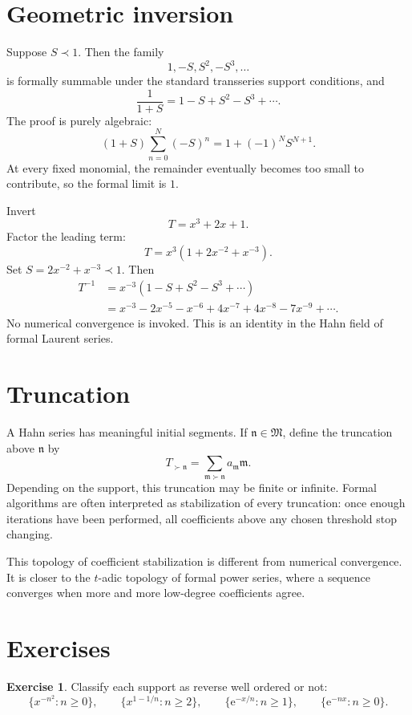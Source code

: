 \documentclass[11pt,openany]{book}
\theoremstyle{definition}
\newtheorem{exercise}{Exercise}[chapter]
\theoremstyle{plain}
\theoremstyle{remark}
\newcommand{\M}{\mathfrak{M}}
\newcommand{\m}{\mathfrak{m}}
\newcommand{\n}{\mathfrak{n}}
\newcommand{\e}{\mathrm{e}}
\newcommand{\precdom}{\prec}
\newcommand{\succdom}{\succ}
\begin{document}
\section{Geometric inversion}

Suppose $S\precdom1$. Then the family
\[
 1,-S,S^2,-S^3,\ldots
\]
is formally summable under the standard transseries support conditions, and
\begin{equation}\label{eq:formal-geometric}
 \frac1{1+S}=1-S+S^2-S^3+\cdots.
\end{equation}
The proof is purely algebraic:
\[
 (1+S)\sum_{n=0}^{N}(-S)^n=1+(-1)^NS^{N+1}.
\]
At every fixed monomial, the remainder eventually becomes too small to contribute, so the formal limit is $1$.

\begin{workedbox}
Invert
\[
 T=x^3+2x+1.
\]
Factor the leading term:
\[
 T=x^3(1+2x^{-2}+x^{-3}).
\]
Set $S=2x^{-2}+x^{-3}\precdom1$. Then
\begin{align*}
 T^{-1}
 &=x^{-3}(1-S+S^2-S^3+\cdots)\\
 &=x^{-3}-2x^{-5}-x^{-6}+4x^{-7}+4x^{-8}
 -7x^{-9}+\cdots.
\end{align*}
No numerical convergence is invoked. This is an identity in the Hahn field of formal Laurent series.
\end{workedbox}

\section{Truncation}

A Hahn series has meaningful initial segments. If $\n\in\M$, define the truncation above $\n$ by
\[
 T_{\succdom\n}=\sum_{\m\succdom\n}a_{\m}\m.
\]
Depending on the support, this truncation may be finite or infinite. Formal algorithms are often interpreted as stabilization of every truncation: once enough iterations have been performed, all coefficients above any chosen threshold stop changing.

This topology of coefficient stabilization is different from numerical convergence. It is closer to the $t$-adic topology of formal power series, where a sequence converges when more and more low-degree coefficients agree.

\section{Exercises}

\begin{exercise}
Classify each support as reverse well ordered or not:
\[
 \{x^{-n^2}:n\ge0\},\qquad
 \{x^{1-1/n}:n\ge2\},\qquad
 \{\e^{-x/n}:n\ge1\},\qquad
 \{\e^{-nx}:n\ge0\}.
\]
\end{exercise}
\end{document}
